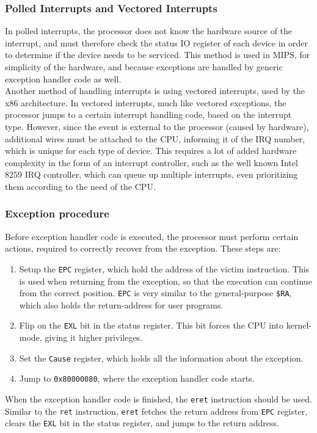 \subsubsection{Polled Interrupts and Vectored Interrupts}
In polled interrupts, the processor does not know the hardware source of the
interrupt, and must therefore check the status IO register of each device in
order to determine if the device needs to be serviced\cite{cs_pitt:exceptions}.
This method is used in MIPS, for simplicity of the hardware, and because exceptions
are handled by generic exception handler code as well.\\
Another method of handling interrupts is using vectored interrupts, used by
the x86 architecture. In vectored interrupts, much like vectored exceptions, the
processor jumps to a certain interrupt handling code, based on the interrupt type.
However, since the event is external to the processor (caused by hardware),
additional wires must be attached to the CPU, informing it of the IRQ number,
which is unique for each type of device\cite{osdev:interrupts}. This requires
a lot of added hardware complexity in the form of an interrupt controller,
such as the well known Intel 8259 IRQ controller, which can queue up
multiple interrupts, even prioritizing them according to the need of the CPU\cite{osdev:interrupts}.

\subsubsection{Exception procedure}
\label{sec:exception_procedure}
Before exception handler code is executed, the processor must perform certain
actions, required to correctly recover from the exception. These steps are\cite{see_mips_run}:
\begin{enumerate}
\item Setup the \texttt{EPC} register, which hold the address of the victim
instruction. This is used when returning from the exception, so that the
execution can continue from the correct position. \texttt{EPC} is very similar to the
general-purpose \texttt{\$RA}, which also holds the return-address for user
programs.
\item Flip on the \texttt{EXL} bit in the status register. This bit forces the
CPU into kernel-mode, giving it higher privileges.
\item Set the \texttt{Cause} register, which holds all the information about
the exception.
\item Jump to \texttt{0x80000080}, where the exception handler code starts.
\end{enumerate}
When the exception handler code is finished, the \texttt{eret} instruction should
be used. Similar to the \texttt{ret} instruction, \texttt{eret} fetches the return
address from \texttt{EPC} register, clears the \texttt{EXL} bit in the status
register, and jumps to the return address.


